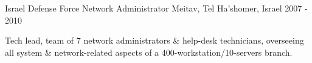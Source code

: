 \begin{cventries}
  \cventry
    {Israel Defense Force}
    {Network Administrator}
    {Meitav, Tel Ha'shomer, Israel}
    {2007 - 2010}
    {
      \begin{cvitems}
        \item {Tech lead, team of 7 network administrators \& help-desk technicians, overseeing all system \& network-related aspects of a 400-workstation/10-servers branch.}
      \end{cvitems}
    }

\end{cventries}

